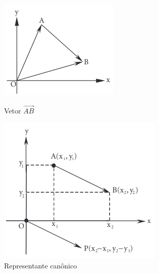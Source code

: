 \begin{figure}[H]
  \centering
  \begin{minipage}{0.45\textwidth}
    \centering
    \includegraphics[width=\linewidth]{./fig/fig1.44.png}
    \caption{Vetor $\overrightarrow{AB}$}\label{fig:fig1.44}
  \end{minipage}
  \hfill
  \begin{minipage}{0.45\textwidth}
    \centering
    \includegraphics[width=\linewidth]{./fig/fig1.45.png}
    \caption{Representante canônico}\label{fig:fig1.45}
  \end{minipage}
\end{figure}

